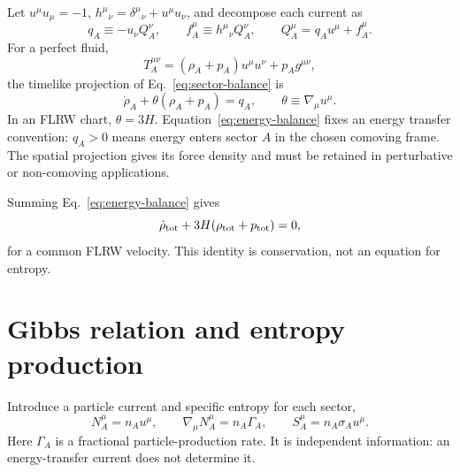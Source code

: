 \documentclass[aps,prd,reprint,superscriptaddress,nofootinbib,floatfix]{revtex4-2}
\begin{document}
Let \(u^\mu u_\mu=-1\), \(h^\mu{}_\nu=\delta^\mu{}_\nu+u^\mu u_\nu\),
and decompose each current as
\begin{equation}
 q_A\equiv-u_\nu Q_A^\nu,
 \qquad
 f_A^\mu\equiv h^\mu{}_\nu Q_A^\nu,
 \qquad
 Q_A^\mu=q_Au^\mu+f_A^\mu .
 \label{eq:current-decomp}
\end{equation}
For a perfect fluid,
\begin{equation}
 T_A^{\mu\nu}=(\rho_A+p_A)u^\mu u^\nu+p_Ag^{\mu\nu},
\end{equation}
the timelike projection of Eq.~\eqref{eq:sector-balance} is
\begin{equation}
 \dot\rho_A+\theta(\rho_A+p_A)=q_A,
 \qquad
 \theta\equiv\nabla_\mu u^\mu.
 \label{eq:energy-balance}
\end{equation}
In an FLRW chart, \(\theta=3H\).  Equation~\eqref{eq:energy-balance} fixes an
energy transfer convention: \(q_A>0\) means energy enters sector \(A\) in the
chosen comoving frame.  The spatial projection gives its force density and
must be retained in perturbative or non-comoving applications.

Summing Eq.~\eqref{eq:energy-balance} gives
\begin{equation}
 \dot\rho_{\rm tot}+3H(\rho_{\rm tot}+p_{\rm tot})=0,
 \label{eq:total-continuity}
\end{equation}
for a common FLRW velocity.  This identity is conservation, not an equation
for entropy.

\section{Gibbs relation and entropy production}
\label{sec:gibbs}

Introduce a particle current and specific entropy for each sector,
\begin{equation}
 N_A^\mu=n_Au^\mu,
 \qquad
 \nabla_\mu N_A^\mu=n_A\Gamma_A,
 \qquad
 S_A^\mu=n_A\sigma_Au^\mu .
 \label{eq:number-entropy}
\end{equation}
Here \(\Gamma_A\) is a fractional particle-production rate.  It is independent
information: an energy-transfer current does not determine it.
\end{document}
